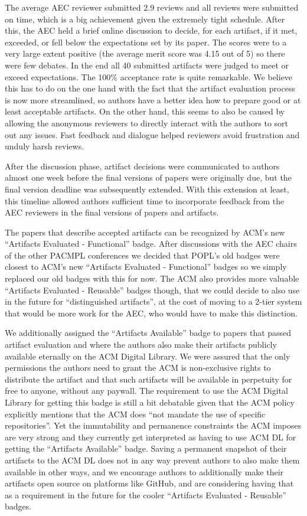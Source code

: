 The average AEC reviewer submitted 2.9 reviews and all reviews were submitted on
time, which is a big achievement given the extremely tight schedule. After this,
the AEC held a brief online discussion to decide, for each artifact, if it met,
exceeded, or fell below the expectations set by its paper. The scores were to a
very large extent positive (the average merit score was 4.15 out of 5) so there
were few debates. In the end all 40 submitted artifacts were judged to meet or
exceed expectations. The 100\% acceptance rate is quite remarkable. We believe
this has to do on the one hand with the fact that the artifact evaluation
process is now more streamlined, so authors have a better idea how to prepare
good or at least acceptable artifacts. On the other hand, this seems to also be
caused by allowing the anonymous reviewers to directly interact with the authors
to sort out any issues. Fast feedback and dialogue helped reviewers avoid
frustration and unduly harsh reviews.

After the discussion phase, artifact decisions were communicated to authors
almost one week before the final versions of papers were originally due, but the
final version deadline was subsequently extended. With this extension at least,
this timeline allowed authors sufficient time to incorporate feedback from the
AEC reviewers in the final versions of papers and artifacts.

The papers that describe accepted artifacts can be recognized by ACM’s new
``Artifacts Evaluated - Functional'' badge. After discussions with the AEC chairs
of the other PACMPL conferences we decided that POPL’s old badges were closest
to ACM’s new “Artifacts Evaluated - Functional” badges so we simply replaced our
old badges with this for now. The ACM also provides more valuable “Artifacts
Evaluated - Reusable” badges though, that we could decide to also use in the
future for ``distinguished artifacts'', at the cost of moving to a 2-tier system
that would be more work for the AEC, who would have to make this distinction.

We additionally assigned the ``Artifacts Available'' badge to papers that passed
artifact evaluation and where the authors also make their artifacts publicly
available eternally on the ACM Digital Library. We were assured that the only
permissions the authors need to grant the ACM is non-exclusive rights to
distribute the artifact and that such artifacts will be available in perpetuity
for free to anyone, without any paywall. The requirement to use the ACM Digital
Library for getting this badge is still a bit debatable given that the ACM
policy explicitly mentions that the ACM does ``not mandate the use of specific
repositories''. Yet the immutability and permanence constraints the ACM imposes
are very strong and they currently get interpreted as having to use ACM DL for
getting the “Artifacts Available” badge. Saving a permanent snapshot of their
artifacts to the ACM DL does not in any way prevent authors to also make them
available in other ways, and we encourage authors to additionally make their
artifacts open source on platforms like GitHub, and are considering having that
as a requirement in the future for the cooler ``Artifacts Evaluated - Reusable''
badges.

